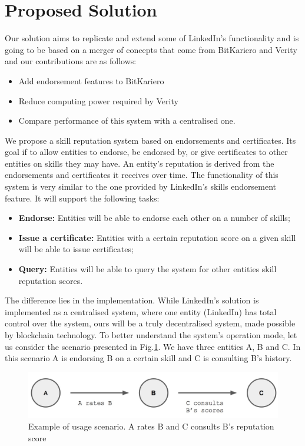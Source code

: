 \documentclass[llncsdoc]{llncs}
\begin{document}
\section{Proposed Solution}
Our solution aims to replicate and extend some of LinkedIn's functionality and is going to be based on a merger of concepts that come from BitKariero and Verity and our contributions are as follows:
\begin{itemize}
    \item Add endorsement features to BitKariero
    \item Reduce computing power required by Verity
    \item Compare performance of this system with a centralised one.
\end{itemize}
We propose a skill reputation system based on endorsements and certificates. Its goal if to allow entities to endorse, be endorsed by, or give certificates to other entities on skills they may have. An entity's reputation is derived from the endorsements and certificates it receives over time.
The functionality of this system is very similar to the one provided by LinkedIn's skills endorsement feature. It will support the following tasks:
\begin{itemize}
    \item \textbf{Endorse:} Entities will be able to endorse each other on a number of skills;
    \item\textbf{Issue a certificate:} Entities with a certain reputation score on a given skill will be able to issue certificates;
    \item \textbf{Query:} Entities will be able to query the system for other entities skill reputation scores.
\end{itemize}
The difference lies in the implementation. While LinkedIn's solution is implemented as a centralised system, where one entity (LinkedIn) has total control over the system, ours will be a truly decentralised system, made possible by blockchain technology.
To better understand the system's operation mode, let us consider the scenario presented in Fig.\ref{fig:basic1}. We have three entities A, B and C. In this scenario A is endorsing B on a certain skill and C is consulting B's history.

\begin{figure}
  \includegraphics[width=\linewidth]{images/basic_scenario.jpg}
  \caption{Example of usage scenario. A rates B and C consults B's reputation score}
  \label{fig:basic1}
\end{figure}
\end{document}
